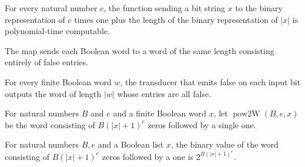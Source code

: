 \begin{theorem}
\label{Randomized.BPLInP.polyTimeComputable_radius}
\leanok
{}
For every natural number $c$, the function sending a bit string $x$ to the binary
representation of $c$ times one plus the length of the binary representation of $|x|$ is
polynomial-time computable.
\end{theorem}

\begin{definition}
\label{Randomized.BPLInP.zerosW}
\leanok
{}
The map sends each Boolean word to a word of the same length consisting entirely of
false entries.
\end{definition}

\begin{theorem}
\label{Randomized.BPLInP.zerosW_eq}
\leanok
{}
For every finite Boolean word $w$, the transducer that emits false on each input bit
outputs the word of length $|w|$ whose entries are all false.
\end{theorem}

\begin{definition}
\label{Randomized.BPLInP.pow2W}
\leanok
{}
For natural numbers $B$ and $e$ and a finite Boolean word $x$, let
$\operatorname{pow2W}(B,e,x)$ be the word consisting of $B(|x|+1)^e$ zeros followed by a
single one.
\end{definition}

\begin{theorem}
\label{Randomized.BPLInP.bitsVal_pow2W}
\leanok
{}
For natural numbers $B,e$ and a Boolean list $x$, the binary value of the word
consisting of $B(|x|+1)^e$ zeros followed by a one is $2^{B(|x|+1)^e}$.
\end{theorem}

